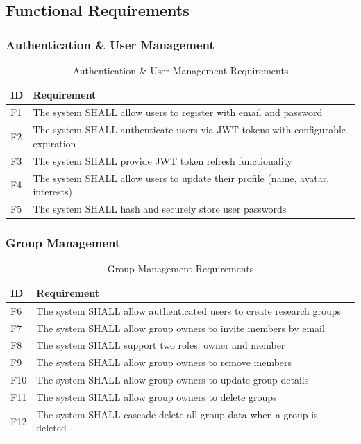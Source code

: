 \documentclass[11pt,a4paper]{article}
\begin{document}
\subsection{Functional Requirements}

\subsubsection{Authentication \& User Management}

\begin{table}[H]
\centering
\begin{tabular}{p{1.5cm}p{11.5cm}}
\toprule
\textbf{ID} & \textbf{Requirement} \\
\midrule
F1 & The system SHALL allow users to register with email and password \\
F2 & The system SHALL authenticate users via JWT tokens with configurable expiration \\
F3 & The system SHALL provide JWT token refresh functionality \\
F4 & The system SHALL allow users to update their profile (name, avatar, interests) \\
F5 & The system SHALL hash and securely store user passwords \\
\bottomrule
\end{tabular}
\caption{Authentication \& User Management Requirements}
\end{table}

\subsubsection{Group Management}

\begin{table}[H]
\centering
\begin{tabular}{p{1.5cm}p{11.5cm}}
\toprule
\textbf{ID} & \textbf{Requirement} \\
\midrule
F6 & The system SHALL allow authenticated users to create research groups \\
F7 & The system SHALL allow group owners to invite members by email \\
F8 & The system SHALL support two roles: owner and member \\
F9 & The system SHALL allow group owners to remove members \\
F10 & The system SHALL allow group owners to update group details \\
F11 & The system SHALL allow group owners to delete groups \\
F12 & The system SHALL cascade delete all group data when a group is deleted \\
\bottomrule
\end{tabular}
\caption{Group Management Requirements}
\end{table}
\end{document}
